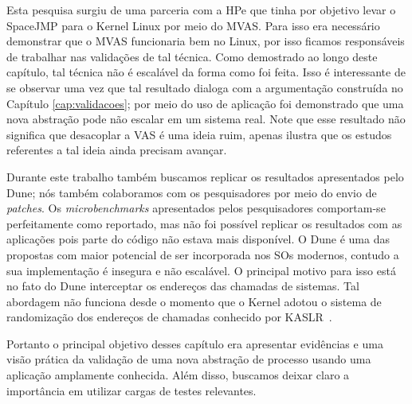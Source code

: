 Esta pesquisa surgiu de uma parceria com a HPe que tinha por objetivo levar o
SpaceJMP para o Kernel Linux por meio do MVAS. Para isso era necessário
demonstrar que o MVAS funcionaria bem no Linux, por isso ficamos responsáveis
de trabalhar nas validações de tal técnica. Como demostrado ao longo deste
capítulo, tal técnica não é escalável da forma como foi feita. Isso é
interessante de se observar uma vez que tal resultado dialoga com a
argumentação construída no Capítulo \ref{cap:validacoes}; por meio do uso de
aplicação foi demonstrado que uma nova abstração pode não escalar em um sistema real.
Note que esse resultado não significa que desacoplar a VAS é uma ideia ruim,
apenas ilustra que os estudos referentes a tal ideia ainda precisam avançar.

Durante este trabalho também buscamos replicar os resultados apresentados pelo
Dune; nós também colaboramos com os pesquisadores por meio do envio de
\textit{patches}. Os \textit{microbenchmarks} apresentados pelos pesquisadores
comportam-se perfeitamente como reportado, mas não foi possível replicar os
resultados com as aplicações pois parte do código não estava mais disponível. O
Dune é uma das propostas com maior potencial de ser incorporada nos SOs
modernos, contudo a sua implementação é insegura e não escalável. O principal
motivo para isso está no fato do Dune interceptar os endereços das chamadas de
sistemas. Tal abordagem não funciona desde o momento que o Kernel adotou o
sistema de randomização dos endereços de chamadas conhecido por
KASLR~\citep{kaslr}.

Portanto o principal objetivo desses capítulo era apresentar evidências e uma
visão prática da validação de uma nova abstração de processo usando uma
aplicação amplamente conhecida. Além disso, buscamos deixar claro a importância
em utilizar cargas de testes relevantes.

